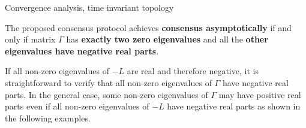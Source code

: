 \begin{frame}{Convergence analysis, time invariant topology}
\vskip 0.5cm
\begin{block}{}
The proposed consensus protocol achieves \textbf{consensus asymptotically} if and only if matrix $\Gamma$
has \textbf{exactly two zero eigenvalues} and all the \textbf{other eigenvalues have negative real parts}.
\end{block}
\vskip 0.7cm
If all non-zero eigenvalues of  $-L$ are real and therefore negative, 
it is straightforward to verify that all non-zero eigenvalues of $\Gamma$ have negative real parts. 
\vskip 0.7cm
In the general case, some non-zero eigenvalues of $\Gamma$ 
may have positive real parts even if all non-zero eigenvalues of  $-L$ 
have negative real parts as shown in the following examples.

\end{frame}
